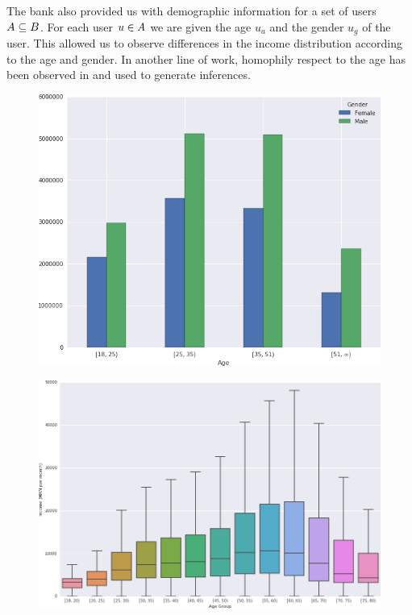 The bank also provided us with demographic information for a set of users \( \mathlarger{A} \subseteq \mathlarger{B} \). For each user \( u \in \mathlarger{A} \) we are given  the age \( u_a \) and the gender \( u_g \) of the user. This allowed us to observe differences in the income distribution according to the age and gender. In another line of work, homophily respect to the age has been observed in \cite{brea2014} and used to generate inferences.

\begin{figure}[h]
\begin{center}
\includegraphics[width=0.8\columnwidth]{figures/gender_age_bar3/gender_age_bar3.png}
\caption{ \protect}
\label{gender_age_bar}
\end{center}
\end{figure}

\begin{figure}[h]
\begin{center}
\includegraphics[width=0.95\columnwidth]{figures/income_age_boxplot4/income_age_boxplot4.png}
\caption{ \protect}
\label{income_age_boxplot}
\end{center}
\end{figure}

